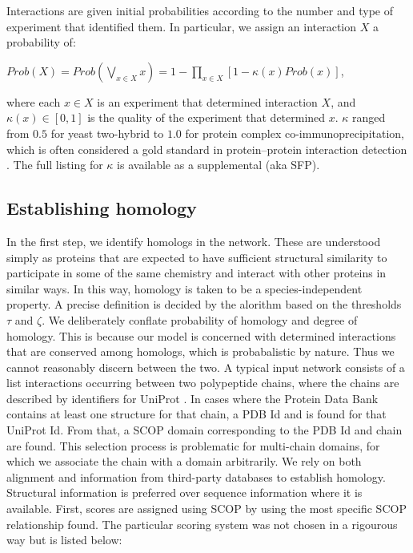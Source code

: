 \documentclass[12pt,twoside]{article}
\def\NI{\noindent}
\begin{document}
\NI Interactions are given initial probabilities according to the number and type of experiment that identified them. In particular, we assign an interaction $X$ a probability of:

\NI $Prob(X) = \displaystyle Prob \left( \bigvee_{x \in X} x \right) = 1 - \prod_{x \in X} \left[1 - \kappa(x) Prob(x) \right]$,

\NI where each $x \in X$ is an experiment that determined interaction $X$, and $\kappa(x) \in [0,1]$ is the quality of the experiment that determined $x$. $\kappa$ ranged from $0.5$ for yeast two-hybrid to $1.0$ for protein complex co-immunoprecipitation, which is often considered a gold standard in protein--protein interaction detection \cite{kaboord}. The full listing for $\kappa$ is available as a supplemental (aka SFP).

\subsection{Establishing homology}
\NI In the first step, we identify homologs in the network. These are understood simply as proteins that are expected to have sufficient structural similarity to participate in some of the same chemistry and interact with other proteins in similar ways. In this way, homology is taken to be a species-independent property. A precise definition is decided by the alorithm based on the thresholds $\tau$ and $\zeta$. We deliberately conflate probability of homology and degree of homology. This is because our model is concerned with determined interactions that are conserved among homologs, which is probabalistic by nature. Thus we cannot reasonably discern between the two.
\NI A typical input network consists of a list interactions occurring between two polypeptide chains, where the chains are described by identifiers for UniProt \cite{uniprot}. In cases where the Protein Data Bank \cite{pdb} contains at least one structure for that chain, a PDB Id and is found for that UniProt Id. From that, a SCOP \cite{scop} domain corresponding to the PDB Id and chain are found. This selection process is problematic for multi-chain domains, for which we associate the chain with a domain arbitrarily.
\NI We rely on both alignment and information from third-party databases to establish homology. Structural information is preferred over sequence information where it is available. First, scores are assigned using SCOP by using the most specific SCOP relationship found. The particular scoring system was not chosen in a rigourous way but is listed below:
\end{document}
